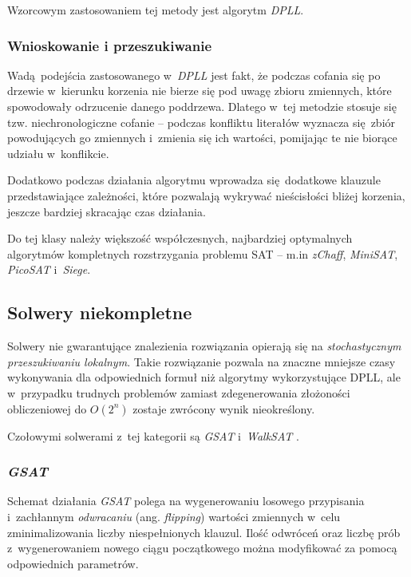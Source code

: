 Wzorcowym zastosowaniem tej metody jest algorytm \textit{DPLL}.

\subsubsection{Wnioskowanie i przeszukiwanie}
Wadą podejścia zastosowanego w~\textit{DPLL} jest fakt, że podczas cofania się po drzewie w~kierunku korzenia nie bierze się pod uwagę
zbioru zmiennych, które spowodowały odrzucenie danego poddrzewa.
Dlatego w~tej metodzie stosuje się tzw. niechronologiczne cofanie -- podczas konfliktu literałów wyznacza się zbiór powodujących 
go zmiennych i~zmienia się ich wartości, pomijając te nie biorące udziału w~konflikcie.

Dodatkowo podczas działania algorytmu wprowadza się dodatkowe klauzule przedstawiające zależności, które pozwalają wykrywać nieścisłości 
bliżej korzenia, jeszcze bardziej skracając czas działania.

Do tej klasy należy większość współczesnych, najbardziej optymalnych algorytmów kompletnych rozstrzygania problemu SAT -- m.in 
\textit{zChaff}, \textit{MiniSAT}, \textit{PicoSAT} i~\textit{Siege}.

\subsection{Solwery niekompletne}
Solwery nie gwarantujące znalezienia rozwiązania opierają się na \textit{stochastycznym przeszukiwaniu lokalnym}.
Takie rozwiązanie pozwala na znaczne mniejsze czasy wykonywania dla odpowiednich formuł niż algorytmy wykorzystujące DPLL, ale
w~przypadku trudnych problemów zamiast zdegenerowania złożoności obliczeniowej do $O(2^n)$ zostaje zwrócony wynik nieokreślony.  

Czołowymi solwerami z~tej kategorii są \textit{GSAT} i~\textit{WalkSAT} \cite{handbook-satifiability-incomplete}.


\subsubsection{\textit{GSAT}}
\label{sec:gsat}
Schemat działania \textit{GSAT} polega na wygenerowaniu losowego przypisania i~zachłannym \textit{odwracaniu} (ang. \textit{flipping})
wartości zmiennych w~celu zminimalizowania liczby niespełnionych klauzul. Ilość odwróceń oraz liczbę prób
z~wygenerowaniem nowego ciągu początkowego można modyfikować za pomocą odpowiednich parametrów.

